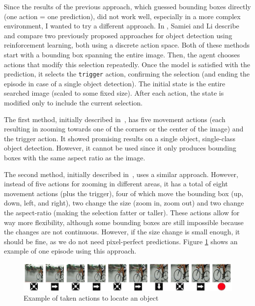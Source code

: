 \documentclass[
  digital,     %
  oneside,     %
  nosansbold,  %
  nocolorbold, %
  lof,         %
  lot,         %
]{fithesis4}
\begin{document}
Since the results of the previous approach, which guessed bounding boxes directly (one action = one prediction), did not work well, especially in a more complex environment, I wanted to try a different approach. In \cite{rl_object_detection}, Samiei and Li describe and compare two previously proposed approaches for object detection using reinforcement learning, both using a discrete action space. Both of these methods start with a bounding box spanning the entire image. Then, the agent chooses actions that modify this selection repeatedly. Once the model is satisfied with the prediction,  it selects the \texttt{trigger} action, confirming the selection (and ending the episode in case of a single object detection). The initial state is the entire searched image (scaled to some fixed size). After each action, the state is modified only to include the current selection.

The first method, initially described in~\cite{hierarchical_od_with_drl}, has five movement actions (each resulting in zooming towards one of the corners or the center of the image) and the trigger action. It showed promising results on a single object, single-class object detection. However, it cannot be used since it only produces bounding boxes with the same aspect ratio as the image.

The second method, initially described in~\cite{iterative_od_with_rl}, uses a similar approach. However, instead of five actions for zooming in different areas, it has a total of eight movement actions (plus the trigger), four of which move the bounding box (up, down, left, and right), two change the size (zoom in, zoom out) and two change the aspect-ratio (making the selection fatter or taller). These actions allow for way more flexibility, although some bounding boxes are still impossible because the changes are not continuous. However, if the size change is small enough, it should be fine, as we do not need pixel-perfect predictions. Figure \ref{fig:exmaple_from_paper} shows an example of one episode using this approach.

\begin{figure}
    \centering
    \includegraphics[width=1\linewidth]{diagrams/45.jpg}
    \caption{Example of taken actions to locate an object~\cite{iterative_od_with_rl}}
    \label{fig:exmaple_from_paper}
\end{figure}
\end{document}
